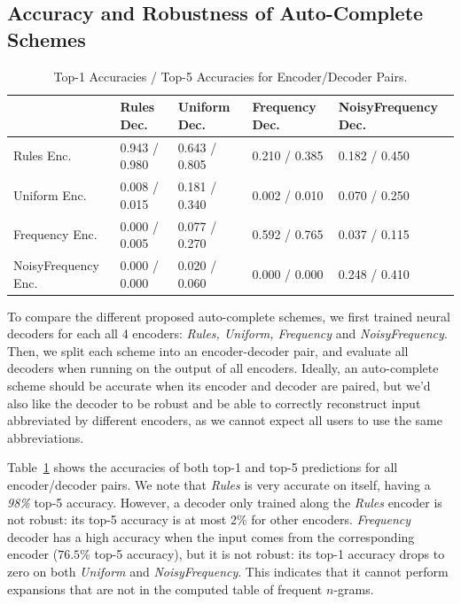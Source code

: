 \documentclass{article}
\begin{document}
\subsection{Accuracy and Robustness of Auto-Complete Schemes}

\begin{table}
\centering
\begin{tabular}{|l|l|l|l|l|}
\hline
                    & Rules Dec.     & Uniform Dec.  & Frequency Dec. & NoisyFrequency Dec. \\ \hline
Rules Enc.          & 0.943 / 0.980  & 0.643 / 0.805 & 0.210 / 0.385  & 0.182 / 0.450       \\ \hline
Uniform Enc.        & 0.008 / 0.015  & 0.181 / 0.340 & 0.002 / 0.010  & 0.070 / 0.250       \\ \hline
Frequency Enc.      & 0.000 / 0.005  & 0.077 / 0.270 & 0.592 / 0.765  & 0.037 / 0.115       \\ \hline
NoisyFrequency Enc. & 0.000 / 0.000  & 0.020 / 0.060 & 0.000 / 0.000  & 0.248 / 0.410       \\ \hline
\end{tabular}
\bigskip
\caption{Top-1 Accuracies / Top-5 Accuracies for Encoder/Decoder Pairs.}
\label{tab:top1accnoisy}
\end{table}

To compare the different
proposed auto-complete schemes,
we first trained neural decoders for each all 4
encoders: \emph{Rules, Uniform, Frequency} and \emph{NoisyFrequency}.
Then, we split each scheme
into an encoder-decoder pair,
and evaluate all decoders
when running on the output
of all encoders. Ideally,
an auto-complete scheme should
be accurate when its encoder
and decoder are paired, but
we'd also like the decoder
to be robust and be able to
correctly reconstruct input
abbreviated by different
encoders, as we cannot expect
all users to use the
same abbreviations.

Table~\ref{tab:top1accnoisy}
shows the accuracies of both
top-1 and top-5 predictions
for all encoder/decoder pairs.
We note that \emph{Rules} is
very accurate on itself, having
a \emph{98\%} top-5 accuracy. However,
a decoder only trained along
the \emph{Rules} encoder
is not robust: its top-5 accuracy
is at most $2\%$ for other
encoders. \emph{Frequency} decoder
has a high accuracy when the
input comes from the corresponding
encoder ($76.5$\% top-5 accuracy),
but it is not robust: its top-1
accuracy drops to zero on both
\emph{Uniform} and \emph{NoisyFrequency}. This indicates
that it cannot perform
expansions that are not in
the computed table of
frequent $n$-grams.
\end{document}
